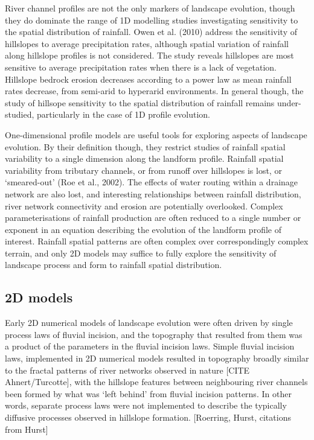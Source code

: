 River channel profiles are not the only markers of landscape evolution, though they do dominate the range of 1D modelling studies investigating sensitivity to the spatial distribution of rainfall. Owen et al. (2010) address the sensitivity of hillslopes to average precipitation rates, although spatial variation of rainfall along hillslope profiles is not considered. The study reveals hillslopes are most sensitive to average precipitation rates when there is a lack of vegetation. Hillslope bedrock erosion decreases according to a power law as mean rainfall rates decrease, from semi-arid to hyperarid environments. In general though, the study of hillsope sensitivity to the spatial distribution of rainfall remains under-studied, particularly in the case of 1D profile evolution.

One-dimensional profile models are useful tools for exploring aspects of landscape evolution. By their definition though, they restrict studies of rainfall spatial variability to a single dimension along the landform profile. Rainfall spatial variability from tributary channels, or from runoff over hillslopes is lost, or `smeared-out' (Roe et al., 2002). The effects of water routing within a drainage network are also lost, and interesting relationships between rainfall distribution, river network connectivity and erosion are potentially overlooked. Complex parameterisations of rainfall production are often reduced to a single number or exponent in an equation describing the evolution of the landform profile of interest. Rainfall spatial patterns are often complex over correspondingly complex terrain, and only 2D models may suffice to fully explore the sensitivity of landscape process and form to rainfall spatial distribution.

\subsection{2D models}
Early 2D numerical models of landscape evolution were often driven by single process laws of fluvial incision, and the topography that resulted from them was a product of the parameters in the fluvial incision laws. Simple fluvial incision laws, implemented in 2D numerical models resulted in topography broadly similar to the fractal patterns of river networks observed in nature [CITE Ahnert/Turcotte], with the hillslope features between neighbouring river channels been formed by what was `left behind' from fluvial incision patterns. In other words, separate process laws were not implemented to describe the typically diffusive processes observed in hillslope formation. [Roerring, Hurst, citations from Hurst]

